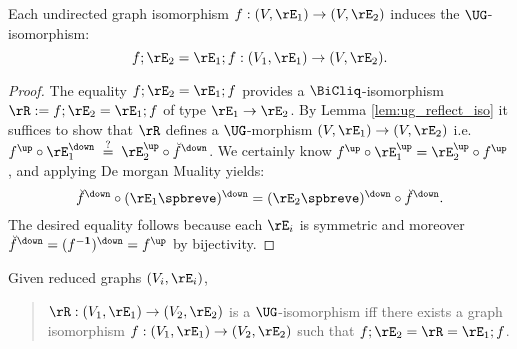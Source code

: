 \documentclass{article}
\begin{document}
\smallskip


\begin{lemma}
\label{lem:ugraph_iso_induce_ug_iso}
\item
Each undirected graph isomorphism $f : (V,\rE_1) \to (V,\rE_2)$ induces the $\UG$-isomorphism:
\[
f ; \rE_2 = \rE_1 ; f : (V_1,\rE_1) \to (V,\rE_2).
\]
\end{lemma}

\begin{proof}
The equality $f ; \rE_2 = \rE_1 ; f$ provides a $\BiCliq$-isomorphism $\rR := f ; \rE_2 = \rE_1 ; f$ of type $\rE_1 \to \rE_2$. By Lemma \ref{lem:ug_reflect_iso} it suffices to show that $\rR$ defines a $\UG$-morphism $(V,\rE_1) \to (V,\rE_2)$ i.e.\ $f^\up \circ \rE_1^\down \;\stackrel{?}{=}\; \rE_2^\up \circ \breve{f}^\down$. We certainly know $f^\up \circ \rE_1^\up = \rE_2^\up \circ f^\up$, and applying De morgan Muality yields:
\[
\breve{f}^\down \circ (\rE_1\spbreve)^\down = (\rE_2\spbreve)^\down \circ \breve{f}^\down.
\]
The desired equality follows because each $\rE_i$ is symmetric and moreover $\breve{f}^\down = (f^{\bf-1})^\down = f^\up$ by bijectivity.
\end{proof}


\smallskip

\begin{lemma}
\label{lem:reduced_ug_isos_graph_isos_correspondence}
Given reduced graphs $(V_i,\rE_i)$,
\begin{quote}
$\rR : (V_1,\rE_1) \to (V_2,\rE_2)$ is a $\UG$-isomorphism iff there exists a graph isomorphism $f : (V_1,\rE_1) \to (V_2,\rE_2)$ such that $f ; \rE_2 = \rR = \rE_1 ; f$.
\end{quote}
\end{lemma}
\end{document}

